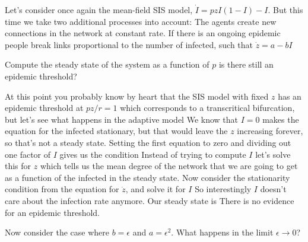 Let's consider once again the mean-field SIS model, $\dot{I}=pzI(1-I)-I$. But this time we take two additional processes into account: The agents create new connections in the network at constant rate. If there is an ongoing epidemic people break links proportional to the number of infected, such that $\dot{z}=a-bI$

\subquestion 
Compute the steady state of the system as a function of $p$ is there still an epidemic threshold?

\solution 
At this point you probably know by heart that the SIS model with fixed $z$ has an epidemic threshold at $pz/r=1$ which corresponds to a transcritical bifurcation, but let's see what happens in the adaptive model 
We know that $I=0$ makes the equation for the infected stationary, but that would leave the $z$ increasing forever, so that's not a steady state. Setting the first equation to zero and dividing out one factor of $I$ gives us the condition
Instead of trying to compute $I$ let's solve this for $z$
which tells us the mean degree of the network that we are going to get as a function of the infected in the steady state. Now consider the stationarity condition from the equation for $\dot{z}$,  
and solve it for $I$
So interestingly $I$ doesn't care about the infection rate anymore. Our steady state is 
There is no evidence for an epidemic threshold. 

\subquestion 
Now consider the case where $b=\epsilon$ and $a=\epsilon^2$. What happens in the limit $\epsilon\to 0$?

